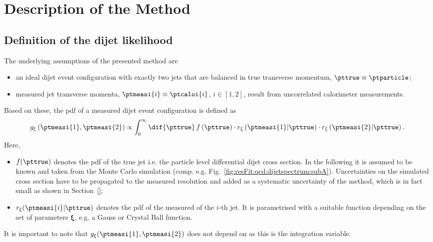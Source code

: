 

\section{Description of the Method}\label{sec:ResFit:Method}

\subsection{Definition of the dijet likelihood}\label{sec:ResFit:Method:Likelihood}

The underlying assumptions of the presented method are
\begin{itemize}
\item an ideal dijet event configuration with exactly two jets that
  are balanced in true transverse momentum, \mbox{$\pttrue\equiv\ptparticle$};
\item measured jet transverse momenta,
  \mbox{$\ptmeasi{i}\equiv\ptcaloi{i}$}, $i\in[1,2]$, result from uncorrelated
  calorimeter measurements.
\end{itemize}
Based on these, the pdf of a measured dijet event configuration is defined as
\begin{equation}
  \label{eq:ResFit:DijetPdf}
  g_{\mathbf{\xi}}\left(\ptmeasi{1},\ptmeasi{2}\right) \propto \int^{\infty}_{0}\dif{\pttrue}\,f\left(\pttrue\right)
  \cdot r_{\mathbf{\xi}}\left(\ptmeasi{1}|\pttrue\right)
  \cdot r_{\mathbf{\xi}}\left(\ptmeasi{2}|\pttrue\right).
\end{equation}
Here,
\begin{itemize}
\item $f(\pttrue)$ denotes the pdf of the true jet \pt
  i.e. the particle level differential dijet cross section.
  In the following it is assumed to be known
  and taken from the Monte Carlo simulation
  (comp. e.g. Fig.~\ref{fig:resFit:qcd:dijetspectrum:subA}).
  Uncertainties on the simulated cross section have to be propagated to
  the measured resolution and added as a systematic uncertainty of the
  method, which is in fact small as shown in Section~\ref{};
\item $r_{\mathbf{\xi}}(\ptmeasi{i}|\pttrue)$ denotes the pdf of the measured \pt
  of the $i$-th jet.
  It is parametrised with a suitable function depending on the set of
  parameters $\mathbf{\xi}$, e.g. a Gauss or Crystal Ball function.
\end{itemize}
It is important to note that
$g_{\mathbf{\xi}}(\ptmeasi{1},\ptmeasi{2})$ does not depend on \pttrue
as this is the integration variable.

